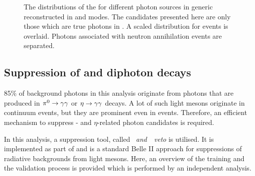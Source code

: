 \begin{figure}[htbp!]
    \centering
    \caption{\label{fig:zmva_distribution_sources} The distributions of the \ZMVA for different photon sources in generic \MC reconstructed in \feiBp and \feiBz modes.
    The candidates presented here are only those which are true photons in .
    A scaled \ZMVA distribution for \BtoXsgamma events is overlaid.
    Photons associated with neutron annihilation events are separated.}
\end{figure}

\subsection{Suppression of \texorpdfstring{\piz}{pi0} and \texorpdfstring{\eta}{eta} diphoton decays}\label{sec:selection_vetos}

85\% of background photons in this analysis originate from photons that are produced in $\pi^0\rightarrow\gamma\gamma$ or $\eta\rightarrow\gamma\gamma$ decays.
A lot of such light mesons originate in continuum events, but they are prominent even in \BB events.
Therefore, an efficient mechanism to suppress \piz- and $\eta$-related photon candidates is required.

In this analysis, a suppression tool, called \textit{\piz~and~\eta~veto} is utilised.
It is implemented as part of \basftwo and is a standard Belle II approach for suppressions of radiative backgrounds from light mesons.
Here, an overview of the training and the validation process is provided which is performed by an independent analysis.

